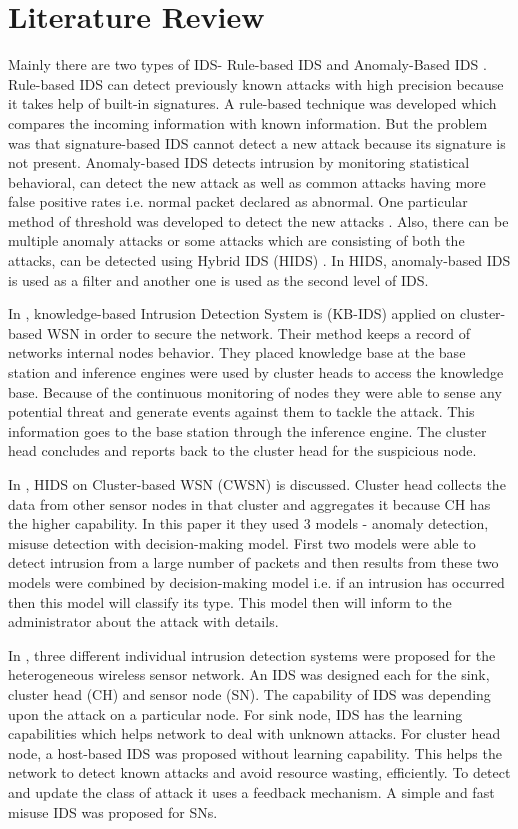 \documentclass{svproc}
\begin{document}
\section{Literature Review}
Mainly there are two types of IDS- Rule-based IDS and Anomaly-Based IDS \cite{khan2010framework}. Rule-based IDS can detect previously known attacks with high precision because it takes help of built-in signatures. A rule-based technique was developed \cite{jha2002building} which compares the incoming information with known information. But the problem was that signature-based IDS cannot detect a new attack because its signature is not present. Anomaly-based IDS detects intrusion by monitoring statistical behavioral, can detect the new attack as well as common attacks having more false positive rates i.e. normal packet declared as abnormal. One particular method of threshold was developed to detect the new attacks \cite{xie2011anomaly}. Also, there can be multiple anomaly attacks or some attacks which are consisting of both the attacks, can be detected using Hybrid IDS (HIDS) \cite{sedjelmaci2011novel}. In HIDS, anomaly-based IDS is used as a filter and another one is used as the second level of IDS.\par
In \cite{mehmood2018secure}, knowledge-based Intrusion Detection System is (KB-IDS) applied on cluster-based WSN in order to secure the network. Their method keeps a record of networks internal nodes behavior. They placed knowledge base at the base station and inference engines were used by cluster heads to access the knowledge base. Because of the continuous monitoring of nodes they were able to sense any potential threat and generate events against them to tackle the attack. This information goes to the base station through the inference engine. The cluster head concludes and reports back to the cluster head for the suspicious node.\par
In \cite{yan2009hybrid}, HIDS on Cluster-based WSN (CWSN) is discussed. Cluster head collects the data from other sensor nodes in that cluster and aggregates it because CH has the higher capability. In this paper it they used 3 models - anomaly detection, misuse detection with decision-making model. First two models were able to detect intrusion from a large number of packets and then results from these two models were combined by decision-making model i.e. if an intrusion has occurred then this model will classify its type. This model then will inform to the administrator about the attack
with details.\par
In \cite{wang2011integrated}, three different individual intrusion detection systems were proposed for the heterogeneous wireless sensor network. An IDS was designed each for the sink, cluster head (CH) and sensor node (SN). The capability of IDS was depending upon the attack on a particular node. For sink node, IDS has the learning capabilities which helps network to deal with unknown attacks. For cluster head node, a host-based IDS was proposed without learning capability. This helps the network to detect known attacks and avoid resource wasting, efficiently. To detect and update the class of attack it uses a feedback mechanism. A simple and fast misuse IDS was proposed for SNs.\par
\end{document}
